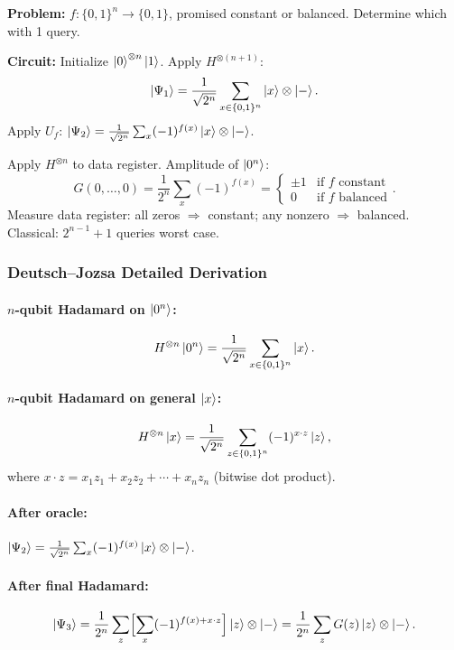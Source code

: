 \documentclass[10pt,a4paper]{article}
\begin{document}
\begin{tcolorbox}[algostyle, title={Algorithm}]
\textbf{Problem:} $f:\{0,1\}^n\to\{0,1\}$, promised constant or balanced. Determine which with 1 query.

\textbf{Circuit:} Initialize $\ket{0}^{\otimes n}\ket{1}$. Apply $H^{\otimes(n+1)}$:
\[
\ket{\Psi_1}=\frac{1}{\sqrt{2^n}}\sum_{x\in\{0,1\}^n}\ket{x}\otimes\ket{-}.
\]
Apply $U_f$: $\ket{\Psi_2}=\frac{1}{\sqrt{2^n}}\sum_x(-1)^{f(x)}\ket{x}\otimes\ket{-}$.

Apply $H^{\otimes n}$ to data register. Amplitude of $\ket{0^n}$:
\[
G(0,\dots,0)=\frac{1}{2^n}\sum_{x}(-1)^{f(x)} = \begin{cases}\pm 1 & \text{if }f\text{ constant}\\ 0 & \text{if }f\text{ balanced}\end{cases}.
\]
Measure data register: all zeros $\Rightarrow$ constant; any nonzero $\Rightarrow$ balanced. Classical: $2^{n-1}+1$ queries worst case.
\end{tcolorbox}

\subsubsection*{Deutsch--Jozsa Detailed Derivation}

\paragraph{$n$-qubit Hadamard on $\ket{0^n}$:}
\[
H^{\otimes n}\ket{0^n} = \frac{1}{\sqrt{2^n}}\sum_{x\in\{0,1\}^n}\ket{x}.
\]

\paragraph{$n$-qubit Hadamard on general $\ket{x}$:}
\[
H^{\otimes n}\ket{x} = \frac{1}{\sqrt{2^n}}\sum_{z\in\{0,1\}^n}(-1)^{x\cdot z}\ket{z},
\]
where $x\cdot z=x_1z_1+x_2z_2+\cdots+x_nz_n$ (bitwise dot product).

\paragraph{After oracle:} $\ket{\Psi_2}=\frac{1}{\sqrt{2^n}}\sum_x(-1)^{f(x)}\ket{x}\otimes\ket{-}$.

\paragraph{After final Hadamard:}
\[
\ket{\Psi_3}=\frac{1}{2^n}\sum_z\Bigl[\sum_x(-1)^{f(x)+x\cdot z}\Bigr]\ket{z}\otimes\ket{-} = \frac{1}{2^n}\sum_z G(z)\ket{z}\otimes\ket{-}.
\]
\end{document}
